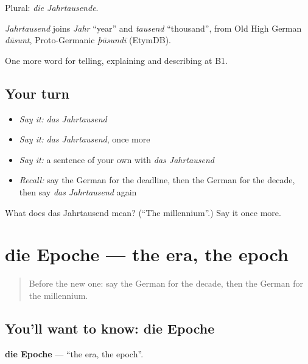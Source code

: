 Plural: \emph{die Jahrtausende}.

\begin{cousinweb}
\emph{Jahrtausend} joins \emph{Jahr} \textquotedblleft{}year\textquotedblright{} and \emph{tausend} \textquotedblleft{}thousand\textquotedblright{}, from Old High German \emph{dūsunt}, Proto-Germanic \emph{þūsundī} (EtymDB).
\end{cousinweb}

\begin{grammarlens}[title={What you've built}]
One more word for telling, explaining and describing at B1.
\end{grammarlens}

\subsection*{Your turn}
\begin{itemize}
\raggedright
  \item \emph{Say it:} \emph{das Jahrtausend}
  \item \emph{Say it:} \emph{das Jahrtausend}, once more
  \item \emph{Say it:} a sentence of your own with \emph{das Jahrtausend}
  \item \emph{Recall:} say the German for the deadline, then the German for the decade, then say \emph{das Jahrtausend} again
\end{itemize}

\begin{tcolorbox}[breakable,colback=teal!4,colframe=teal!35!black,title={Before you move on}]
What does das Jahrtausend mean? (\textquotedblleft{}The millennium\textquotedblright{}.) Say it once more.
\end{tcolorbox}
\section[die Epoche]{die Epoche — the era, the epoch}

\label{lesson:GE-C269-epoche}



\begin{quote}
Before the new one: say the German for the decade, then the German for the millennium.
\end{quote}

\subsection*{You'll want to know: die Epoche}
\textbf{die Epoche} — \textquotedblleft{}the era, the epoch\textquotedblright{}.

